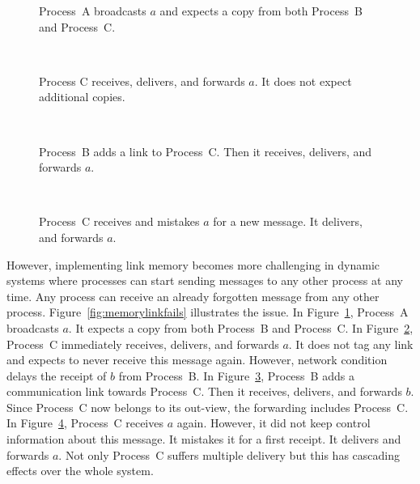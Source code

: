\begin{figure*}[t]
  \begin{center}
    \begin{subfigure}{0.23\textwidth}
      
      \caption{\label{fig:memorylinkfailsA}Process~A broadcasts $a$ and expects a copy
        from both Process~B and Process~C.}
    \end{subfigure}
    ~
    \begin{subfigure}{0.23\textwidth}
      
      \caption{\label{fig:memorylinkfailsB}Process C receives, delivers, and
        forwards $a$. It does not expect additional copies.}
    \end{subfigure}
    ~
    \begin{subfigure}{0.23\textwidth}
      
      \caption{\label{fig:memorylinkfailsC}Process~B adds a link to Process~C. 
        Then it receives, delivers, and forwards $a$.}
    \end{subfigure}
    ~
    \begin{subfigure}{0.23\textwidth}
      
      \caption{\label{fig:memorylinkfailsD}Process~C receives and mistakes $a$
        for a new message. It delivers, and forwards $a$.}
    \end{subfigure}
    \caption{\label{fig:memorylinkfails}Causal broadcast
      (Algorithm~\ref{algo:reliablebroadcast}) fails to forbid multiple delivery
      in dynamic systems. }
  \end{center}
\end{figure*}




However, implementing link memory becomes more challenging in dynamic
systems where processes can start sending messages to any other process at any
time. Any process can receive an already forgotten message from any other
process. Figure~\ref{fig:memorylinkfails} illustrates the issue. In
Figure~\ref{fig:memorylinkfailsA}, Process~A broadcasts $a$. It expects a copy
from both Process~B and Process~C. In Figure~\ref{fig:memorylinkfailsB},
Process~C immediately receives, delivers, and forwards $a$. It does not tag any
link and expects to never receive this message again. However, network condition
delays the receipt of $b$ from Process~B. In Figure~\ref{fig:memorylinkfailsC},
Process~B adds a communication link towards Process~C. Then it receives,
delivers, and forwards $b$. Since Process~C now belongs to its out-view, the
forwarding includes Process~C. In Figure~\ref{fig:memorylinkfailsD}, Process~C
receives $a$ again. However, it did not keep control information about this
message. It mistakes it for a first receipt. It delivers and forwards $a$. Not
only Process~C suffers multiple delivery but this has cascading effects over the
whole system.

